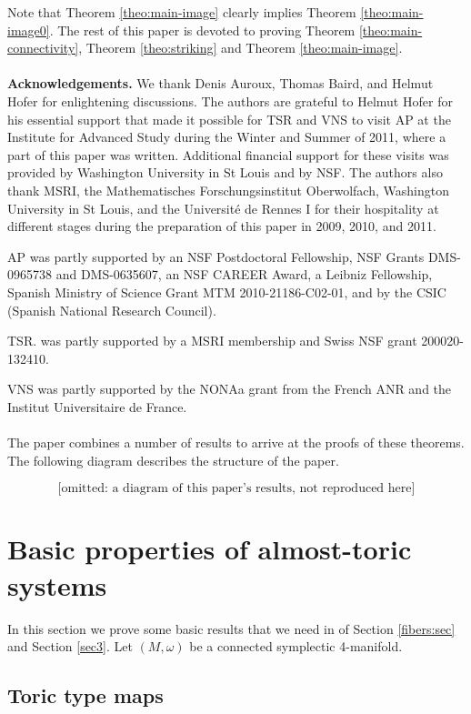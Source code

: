 \documentclass[11pt]{article}
\begin{document}
Note that Theorem \ref{theo:main-image} clearly implies Theorem
\ref{theo:main-image0}. The rest of this paper is devoted to proving
Theorem \ref{theo:main-connectivity}, Theorem \ref{theo:striking} and
Theorem \ref{theo:main-image}.
\\
\\
{\bf Acknowledgements.} We thank Denis Auroux, Thomas Baird, and
Helmut Hofer for enlightening discussions. The authors are grateful to
Helmut Hofer for his essential support that made it possible for TSR
and VNS to visit AP at the Institute for Advanced Study during the
Winter and Summer of 2011, where a part of this paper was
written. Additional financial support for these visits was provided by
Washington University in St Louis and by NSF.  The authors also thank
MSRI, the Mathematisches Forschungsinstitut Oberwolfach, Washington
University in St Louis, and the Universit\'e de Rennes I for their
hospitality at different stages during the preparation of this paper
in 2009, 2010, and 2011.

AP was partly supported by an NSF Postdoctoral Fellowship, NSF Grants
DMS-0965738 and DMS-0635607, an NSF CAREER Award, a Leibniz Fellowship,
Spanish Ministry of Science Grant MTM 2010-21186-C02-01, 
and by the CSIC (Spanish National Research Council).

TSR. was partly supported by a MSRI membership and Swiss NSF grant
200020-132410.

VNS was partly supported by the NONAa grant from the French ANR and
the Institut Universitaire de France.
\\
\\
The paper combines a number of results
to arrive at the proofs of these theorems. The following diagram
describes the structure of the paper.


$$
\mbox{[omitted: a diagram of this paper's results, not reproduced here]}
$$

 


\section{Basic properties of almost-toric systems} \label{sec2}

In this section we prove some basic results that we need in of Section
\ref{fibers:sec} and Section \ref{sec3}. Let $(M, \omega)$ be a
connected symplectic 4-manifold.


\subsection*{Toric type maps}
\end{document}
